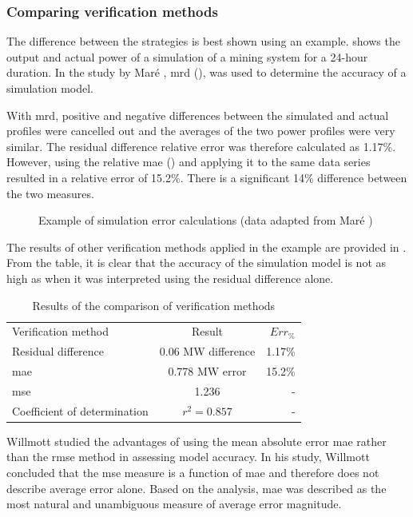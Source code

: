  		\subsubsection{Comparing verification methods}
 		The difference between the strategies is best shown using an example.  shows the output and actual power of a simulation of a mining system for a 24-hour duration. In the study by Maré \cite{Mare2016PhD}, \gls{mrd} (), was used to determine the accuracy of a simulation model.
 		\par 
 		 With \gls{mrd}, positive and negative differences between the simulated and actual profiles were cancelled out and the averages of the two power profiles were very similar. The residual difference relative error was therefore calculated as 1.17\%. However, using the relative \gls{mae} ()  and applying it to the same data series resulted in a relative error of 15.2\%. There is a significant 14\% difference between the two measures. 
 		  \par
		 \clearpage
 	\begin{figure}[!htbp]
 		\centering
 		
 		\caption[Example of simulation error calculations]{Example of simulation error calculations (data adapted from Maré \cite{Mare2016PhD})}
 		\label{fig:Philipp Difference verify}
 	\end{figure}

 The results of other verification methods applied in the example are provided in . From the table, it is clear that the accuracy of the simulation model is not as high as when it was interpreted using the residual difference alone.\\
 	\par 
 \begin{table}[!htbp]
 	\caption{Results of the comparison of verification methods}
 	\centering
 	\begin{tabular}{lcr}
 		\hline
 		Verification method & Result & $Err_{\%}$\\
 		\hhline{===}
 		Residual difference     & 0.06 MW difference & 1.17\% \\
 		\gls{mae} 					 & 0.778 MW error & 15.2\% \\
 		\gls{mse} 				   & 1.236  & -\\
 		Coefficient of determination & $r^2 =0.857$  & -\\
 		\hline
 	\end{tabular} 
 \label{Philip verification table}
 \end{table}
 	Willmott \cite{willmott2005advantages} studied the advantages of using the mean absolute error \gls{mae} rather than the \gls{rmse} method in assessing model accuracy. In his study, Willmott concluded that the \gls{mse} measure is a function of \gls{mae} and therefore does not describe average error alone. Based on the analysis, \gls{mae} was described as the most natural and unambiguous measure of average error magnitude.


